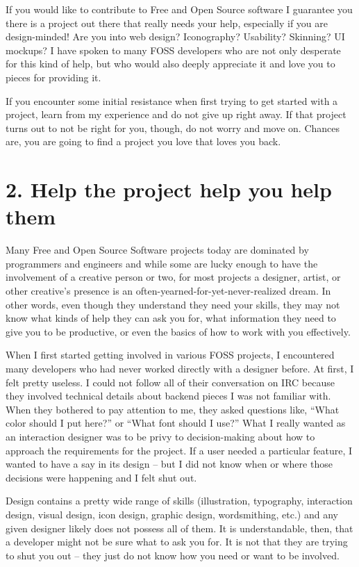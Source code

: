 If you would like to contribute to Free and Open Source software I guarantee you
there is a project out there that really needs your help, especially if you are
design-minded! Are you into web design? Iconography? Usability? Skinning? UI
mockups? I have spoken to many FOSS developers who are not only desperate for
this kind of help, but who would also deeply appreciate it and love you to
pieces for providing it.

If you encounter some initial resistance when first trying to get started with a
project, learn from my experience and do not give up right away. If that project
turns out to not be right for you, though, do not worry and move on. Chances are,
you are going to find a project you love that loves you back.

\section*{2. Help the project help you help them}

Many Free and Open Source Software projects today are dominated by programmers and
engineers and while some are lucky enough to have the involvement of a creative
person or two, for most projects a designer, artist, or other creative's
presence is an often-yearned-for-yet-never-realized dream. In other words, even
though they understand they need your skills, they may not know what kinds of
help they can ask you for, what information they need to give you to be
productive, or even the basics of how to work with you effectively. 

When I first started getting involved in various FOSS projects, I encountered
many developers who had never worked directly with a designer before. At first,
I felt pretty useless. I could not follow all of their conversation on IRC
because they involved technical details about backend pieces I was not familiar
with. When they bothered to pay attention to me, they asked questions like,
``What color should I put here?'' or ``What font should I use?'' What I really
wanted as an interaction designer was to be privy to decision-making about how
to approach the requirements for the project. If a user needed a particular
feature, I wanted to have a say in its design -- but I did not know when or where those decisions were happening and I felt shut out.

Design contains a pretty wide range of skills (illustration, typography,
interaction design, visual design, icon design, graphic design, wordsmithing,
etc.) and any given designer likely does not possess all of them. It is
understandable, then, that a developer might not be sure what to ask you for.
It is not that they are trying to shut you out -- they just do not know how you
need or want to be involved.

